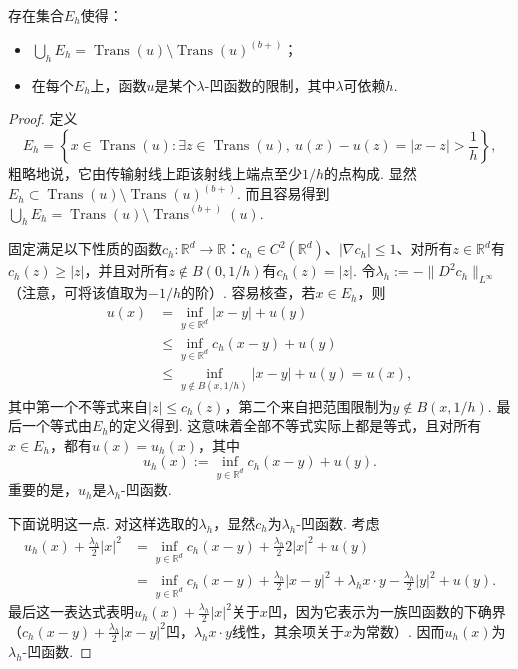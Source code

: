 \begin{proposition}\label{obj:3.15}
存在集合$E_h$使得：
\begin{itemize}
\item $\bigcup_hE_h=\operatorname{Trans}(u)\setminus\operatorname{Trans}(u)^{(b+)}$；
\item 在每个$E_h$上，函数$u$是某个$\lambda$-凹函数的限制，其中$\lambda$可依赖$h$.
\end{itemize}
\end{proposition}
\begin{proof}
定义
\[
E_h=\left\{x\in\operatorname{Trans}(u):\exists z\in\operatorname{Trans}(u),\ u(x)-u(z)=|x-z|>\frac1h\right\},
\]
粗略地说，它由传输射线上距该射线上端点至少$1/h$的点构成. 显然$E_h\subset\operatorname{Trans}(u)\setminus\operatorname{Trans}(u)^{(b+)}$. 而且容易得到$\bigcup_hE_h=\operatorname{Trans}(u)\setminus\operatorname{Trans}^{(b+)}(u)$.

固定满足以下性质的函数$c_h:\mathbb R^d\to\mathbb R$：$c_h\in C^2(\mathbb R^d)$、$|\nabla c_h|\le1$、对所有$z\in\mathbb R^d$有$c_h(z)\ge|z|$，并且对所有$z\notin B(0,1/h)$有$c_h(z)=|z|$. 令$\lambda_h:=-\|D^2c_h\|_{L^\infty}$（注意，可将该值取为$-1/h$的阶）. 容易核查，若$x\in E_h$，则
\begin{equation*}
\begin{aligned}
u(x)&=\inf_{y\in\mathbb R^d}|x-y|+u(y)\\
&\le\inf_{y\in\mathbb R^d}c_h(x-y)+u(y)\\
&\le\inf_{y\notin B(x,1/h)}|x-y|+u(y)=u(x),
\end{aligned}
\end{equation*}
其中第一个不等式来自$|z|\le c_h(z)$，第二个来自把范围限制为$y\notin B(x,1/h)$. 最后一个等式由$E_h$的定义得到. 这意味着全部不等式实际上都是等式，且对所有$x\in E_h$，都有$u(x)=u_h(x)$，其中
\[
u_h(x):=\inf_{y\in\mathbb R^d}c_h(x-y)+u(y).
\]
重要的是，$u_h$是$\lambda_h$-凹函数.

下面说明这一点. 对这样选取的$\lambda_h$，显然$c_h$为$\lambda_h$-凹函数. 考虑
\begin{equation*}
\begin{aligned}
u_h(x)+\frac{\lambda_h}2|x|^2
&=\inf_{y\in\mathbb R^d}c_h(x-y)+\frac{\lambda_h}2 2|x|^2+u(y)\\
&=\inf_{y\in\mathbb R^d}c_h(x-y)+\frac{\lambda_h}2|x-y|^2
+\lambda_hx\cdot y-\frac{\lambda_h}2|y|^2+u(y).
\end{aligned}
\end{equation*}
最后这一表达式表明$u_h(x)+\frac{\lambda_h}2|x|^2$关于$x$凹，因为它表示为一族凹函数的下确界（$c_h(x-y)+\frac{\lambda_h}2|x-y|^2$凹，$\lambda_hx\cdot y$线性，其余项关于$x$为常数）. 因而$u_h(x)$为$\lambda_h$-凹函数.
\end{proof}

